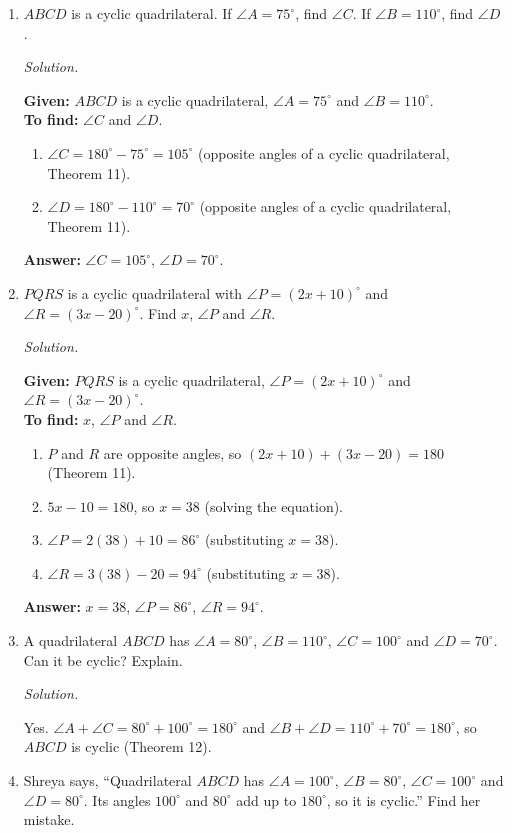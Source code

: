 \documentclass[11pt,a4paper]{article}
\theoremstyle{branddef}
\newenvironment{exercise}[1]
  {\par\medskip\Needspace{7\baselineskip}\noindent{\large\bfseries Exercise #1}
   \par\smallskip
   \begin{enumerate}[leftmargin=*,itemsep=4pt]}
  {\end{enumerate}}
\newenvironment{solution}
  {\par\smallskip\begingroup\small\linespread{1.15}\selectfont\color{muted}\noindent\textit{Solution.}\par}
  {\par\endgroup\smallskip}
\newenvironment{steps}{\begin{enumerate}[label=\arabic*.,leftmargin=1.5em,itemsep=0pt,topsep=2pt]}{\end{enumerate}}
\begin{document}
\begin{exercise}{4A}
\item $ABCD$ is a cyclic quadrilateral. If $\angle A=75^\circ$, find $\angle C$. If $\angle B=110^\circ$, find $\angle D$.
\begin{solution}
\textbf{Given:} $ABCD$ is a cyclic quadrilateral, $\angle A=75^\circ$ and $\angle B=110^\circ$.\\
\textbf{To find:} $\angle C$ and $\angle D$.
\begin{steps}
  \item $\angle C=180^\circ-75^\circ=105^\circ$ (opposite angles of a cyclic quadrilateral, Theorem 11).
  \item $\angle D=180^\circ-110^\circ=70^\circ$ (opposite angles of a cyclic quadrilateral, Theorem 11).
\end{steps}
\textbf{Answer:} $\angle C=105^\circ$, $\angle D=70^\circ$.
\end{solution}
\item $PQRS$ is a cyclic quadrilateral with $\angle P=(2x+10)^\circ$ and $\angle R=(3x-20)^\circ$. Find $x$, $\angle P$ and $\angle R$.
\begin{solution}
\textbf{Given:} $PQRS$ is a cyclic quadrilateral, $\angle P=(2x+10)^\circ$ and $\angle R=(3x-20)^\circ$.\\
\textbf{To find:} $x$, $\angle P$ and $\angle R$.
\begin{steps}
  \item $P$ and $R$ are opposite angles, so $(2x+10)+(3x-20)=180$ (Theorem 11).
  \item $5x-10=180$, so $x=38$ (solving the equation).
  \item $\angle P=2(38)+10=86^\circ$ (substituting $x=38$).
  \item $\angle R=3(38)-20=94^\circ$ (substituting $x=38$).
\end{steps}
\textbf{Answer:} $x=38$, $\angle P=86^\circ$, $\angle R=94^\circ$.
\end{solution}
\item A quadrilateral $ABCD$ has $\angle A=80^\circ$, $\angle B=110^\circ$, $\angle C=100^\circ$ and $\angle D=70^\circ$. Can it be cyclic? Explain.
\begin{solution}
Yes. $\angle A+\angle C=80^\circ+100^\circ=180^\circ$ and $\angle B+\angle D=110^\circ+70^\circ=180^\circ$, so $ABCD$ is cyclic (Theorem 12).
\end{solution}
\item Shreya says, ``Quadrilateral $ABCD$ has $\angle A=100^\circ$, $\angle B=80^\circ$, $\angle C=100^\circ$ and $\angle D=80^\circ$. Its angles $100^\circ$ and $80^\circ$ add up to $180^\circ$, so it is cyclic.'' Find her mistake.

\end{exercise}
\end{document}
